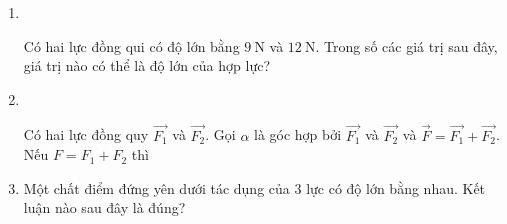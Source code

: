 \begin{enumerate}[label=\bfseries Câu \arabic*:,leftmargin=1.5cm]
{		Tổng hợp lực là thay thế các lực tác dụng đồng thời vào cùng một vật bằng một lực có tác dụng giống hệt như các lực ấy.
	}

	\item {}\\
	{Có hai lực đồng qui có độ lớn bằng $\SI{9}{\newton}$ và $\SI{12}{\newton}$. Trong số các giá trị sau đây, giá trị nào có thể là độ lớn của hợp lực?
	
}

\item {}\\
{Có hai lực đồng quy $\overrightarrow{F_1}$ và $\overrightarrow{F_2}$. Gọi $\alpha$ là góc hợp bởi $\overrightarrow{F_1}$ và $\overrightarrow{F_2}$ và $\overrightarrow{F} =\overrightarrow{F_1}+\overrightarrow{F_2}$. Nếu $F=F_1+F_2$ thì
	\begin{mcq}(4)
		\item $\alpha=\SI{0}{\degree}$.
		\item $\alpha=\SI{180}{\degree}$.
		\item $\alpha=\SI{90}{\degree}$.
		\item $\SI{0}{\degree}<\alpha<\SI{90}{\degree}$.
	\end{mcq}

}

	\item {}
	
	{ Một chất điểm đứng yên dưới tác dụng của $3$ lực có độ lớn bằng nhau. Kết luận nào sau đây là đúng?
	}
\end{enumerate}
